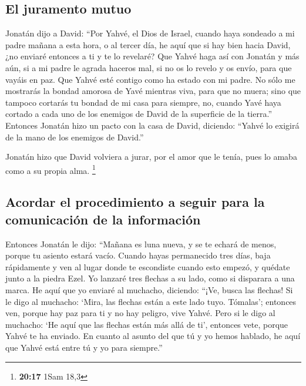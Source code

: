 \hypertarget{el-juramento-mutuo}{%
\subsection{El juramento mutuo}\label{el-juramento-mutuo}}

 Jonatán dijo a David: ``Por Yahvé, el Dios de Israel,
cuando haya sondeado a mi padre mañana a esta hora, o al tercer día, he
aquí que si hay bien hacia David, ¿no enviaré entonces a ti y te lo
revelaré?  Que Yahvé haga así con Jonatán y más aún, si a
mi padre le agrada haceros mal, si no os lo revelo y os envío, para que
vayáis en paz. Que Yahvé esté contigo como ha estado con mi padre.
 No sólo me mostrarás la bondad amorosa de Yavé mientras
viva, para que no muera;  sino que tampoco cortarás tu
bondad de mi casa para siempre, no, cuando Yavé haya cortado a cada uno
de los enemigos de David de la superficie de la tierra.''
 Entonces Jonatán hizo un pacto con la casa de David,
diciendo: ``Yahvé lo exigirá de la mano de los enemigos de David.''

 Jonatán hizo que David volviera a jurar, por el amor que
le tenía, pues lo amaba como a su propia alma. \footnote{\textbf{20:17}
  1Sam 18,3}

\hypertarget{acordar-el-procedimiento-a-seguir-para-la-comunicaciuxf3n-de-la-informaciuxf3n}{%
\subsection{Acordar el procedimiento a seguir para la comunicación de la
información}\label{acordar-el-procedimiento-a-seguir-para-la-comunicaciuxf3n-de-la-informaciuxf3n}}

 Entonces Jonatán le dijo: ``Mañana es luna nueva, y se
te echará de menos, porque tu asiento estará vacío. 
Cuando hayas permanecido tres días, baja rápidamente y ven al lugar
donde te escondiste cuando esto empezó, y quédate junto a la piedra
Ezel.  Yo lanzaré tres flechas a su lado, como si
disparara a una marca.  He aquí que yo enviaré al
muchacho, diciendo: ``¡Ve, busca las flechas! Si le digo al muchacho:
`Mira, las flechas están a este lado tuyo. Tómalas'; entonces ven,
porque hay paz para ti y no hay peligro, vive Yahvé. 
Pero si le digo al muchacho: `He aquí que las flechas están más allá de
ti', entonces vete, porque Yahvé te ha enviado.  En
cuanto al asunto del que tú y yo hemos hablado, he aquí que Yahvé está
entre tú y yo para siempre.''

